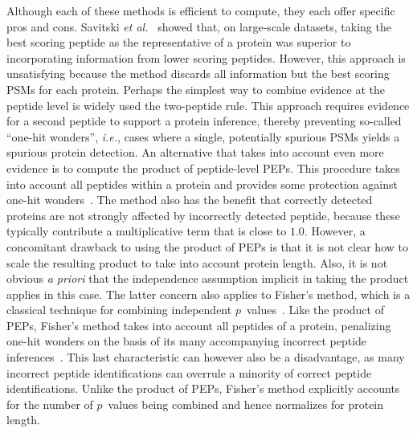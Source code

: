 \documentclass{article}
\begin{document}
Although each of these methods is efficient to compute, they each
offer specific pros and cons.  Savitski {\em et
  al.}~\cite{savitski2015scalable} showed that, on large-scale
datasets, taking the best scoring peptide as the representative of a
protein was superior to incorporating information from lower scoring
peptides. However, this approach is unsatisfying because the method
discards all information but the best scoring PSMs for each protein.
Perhaps the simplest way to combine evidence at the peptide level is
widely used the two-peptide rule.  This approach requires evidence for
a second peptide to support a protein inference, thereby preventing
so-called ``one-hit wonders'', {\em i.e.}, cases where a single,
potentially spurious PSMs yields a spurious protein detection.  An
alternative that takes into account even more evidence is to compute
the product of peptide-level PEPs. This procedure takes into account
all peptides within a protein and provides some protection against
one-hit wonders~\cite{cox2008maxquant}. The method also has the
benefit that correctly detected proteins are not strongly affected by
incorrectly detected peptide, because these typically contribute a
multiplicative term that is close to $1.0$. However, a concomitant
drawback to using the product of PEPs is that it is not clear how to
scale the resulting product to take into account protein length.
Also, it is not obvious {\em a priori} that the independence
assumption implicit in taking the product applies in this case.  The
latter concern also applies to Fisher's method, which is a classical
technique for combining independent
$p$~values~\cite{fisher1925statistical}.
Like the product of PEPs, Fisher's method takes into account all
peptides of a protein, penalizing one-hit wonders on the basis of its
many accompanying incorrect peptide
inferences~\cite{spirin2011assigning, alves2015mass,
  granholm2013determining}.
This last characteristic can however also be a
disadvantage, as many incorrect peptide identifications can overrule a
minority of correct peptide identifications.  Unlike the product of
PEPs, Fisher's method explicitly accounts for the number of $p$~values
being combined and hence normalizes for protein length.
\end{document}
